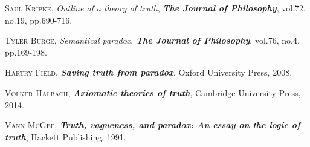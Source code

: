 \documentclass[bsl,meeting]{asl}
\begin{document}
\begin{thebibliography}{10}

{\scshape Saul Kripke},
{\itshape Outline of a theory of truth},
{\bfseries\itshape The Journal of Philosophy},
vol.72, no.19, pp.690-716.

{\scshape Tyler Burge},
{\itshape Semantical paradox},
{\bfseries\itshape The Journal of Philosophy},
vol.76, no.4, pp.169-198.

{\scshape Hartry Field},
{\bfseries\itshape Saving truth from paradox},
Oxford University Press,
2008.

{\scshape Volker Halbach},
{\bfseries\itshape Axiomatic theories of truth},
Cambridge University Press,
2014.

{\scshape Vann McGee},
{\bfseries\itshape Truth, vagueness, and paradox: An essay on the logic of truth},
Hackett Publishing,
1991.


\end{thebibliography}


\vspace*{-0.5\baselineskip}
\end{document}
